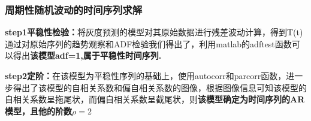 \documentclass{whutmod}
\begin{document}
	\subsubsection{周期性随机波动的时间序列求解}
	\textbf{step1平稳性检验：}将灰度预测的模型对其原始数据进行残差波动计算，得到T(t)通过对原始序列的趋势观察和ADF检验我们得出了，利用matlab的adftest函数可以得出\textbf{该模型adf=1,属于平稳性时间序列.}
	
	
	\textbf{step2定阶：}在该模型为平稳性序列的基础上，使用autocorr和parcorr函数，进一步得出了该模型的自相关系数和偏自相关系数的图像，根据图像信息可知该模型的自相关系数呈拖尾状，而偏自相关系数呈截尾状，则\textbf{该模型确定为时间序列的AR模型，且他的阶数$\rho=2$}
	
\end{document}
